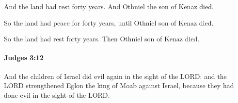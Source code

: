 			\begin{versebox}
					\item[BHS] 
					\item[ASV] And the land had rest forty years. And Othniel the son of Kenaz died.
					\item[NIV] So the land had peace for forty years, until Othniel son of Kenaz died.
					\item[NRSV] So the land had rest forty years. Then Othniel son of Kenaz died.
			\end{versebox}

		\paragraph{Judges 3:12} %
			\label{JUDGES-3-12}

			And the children of Israel did evil again in the sight of the LORD: and the LORD strengthened Eglon the king of Moab against Israel, because they had done evil in the sight of the LORD.

